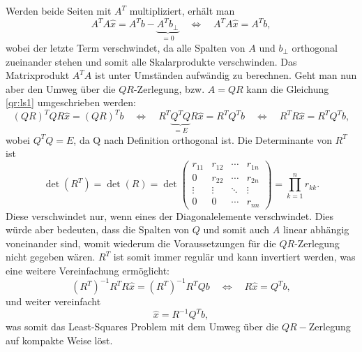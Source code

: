 Werden beide Seiten mit $A^T$ multipliziert, erhält man
\begin{equation}
A^TA\hat{x}=A^Tb-\underbrace{A^Tb_{\perp}}_{\displaystyle=0}
\quad\Leftrightarrow\quad A^TA\hat{x}=A^Tb \label{qr:ls1},
\end{equation}
wobei der letzte Term verschwindet, da alle Spalten von $A$ und $b_{\perp}$ orthogonal zueinander stehen und somit alle Skalarprodukte verschwinden.
Das Matrixprodukt $A^TA$ ist unter Umständen aufwändig zu berechnen.
Geht man nun aber den Umweg über die $QR$-Zerlegung, bzw. $A=QR$ kann die Gleichung \ref{qr:ls1} umgeschrieben werden:
\begin{equation*}
(QR)^TQR\hat{x}=(QR)^Tb \quad \Leftrightarrow \quad R^T\underbrace{Q^TQ}_{\displaystyle=E}R\hat{x}= R^TQ^Tb \quad \Leftrightarrow \quad
R^TR\hat{x}=R^TQ^Tb,
\end{equation*}
wobei $Q^TQ=E$, da Q nach Definition orthogonal ist.
Die Determinante von $R^T$ ist
\begin{equation*}
\det(R^T)=\det(R)=\det
\begin{pmatrix}
r_{11}&r_{12}&\cdots &r_{1n}\\
0     &r_{22}&\cdots &r_{2n}\\
\vdots&\vdots&\ddots&\vdots\\
0&0&\cdots&r_{nn}
\end{pmatrix}=\prod_{k=1}^{n}r_{kk}.
\end{equation*}
Diese verschwindet nur, wenn eines der Diagonalelemente verschwindet.
Dies würde aber bedeuten, dass die Spalten von $Q$ und somit auch $A$ linear abhängig voneinander sind, womit wiederum die Voraussetzungen für die $QR$-Zerlegung nicht gegeben wären.
$R^T$ ist somit immer regulär und kann invertiert werden, was eine weitere Vereinfachung ermöglicht:
\begin{equation*}
(R^T)^{-1}R^TR\hat{x}=(R^T)^{-1}R^TQb\quad\Leftrightarrow\quad R\hat{x}=Q^Tb,
\end{equation*}
und weiter vereinfacht
\begin{equation}
\hat{x}=R^{-1}Q^Tb,
\end{equation}
was somit das Least-Squares Problem mit dem Umweg über die $QR-$Zerlegung auf kompakte Weise löst.
